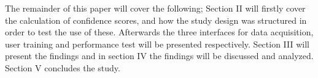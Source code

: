 The remainder of this paper will cover the following; Section II will firstly cover the calculation of confidence scores, and how the study design was structured in order to test the use of these. Afterwards the three interfaces for data acquisition, user training and performance test will be presented respectively. Section III will present the findings and in section IV the findings will be discussed and analyzed. Section V concludes the study.   


 
 
% 
%
%
%
%
%
%
